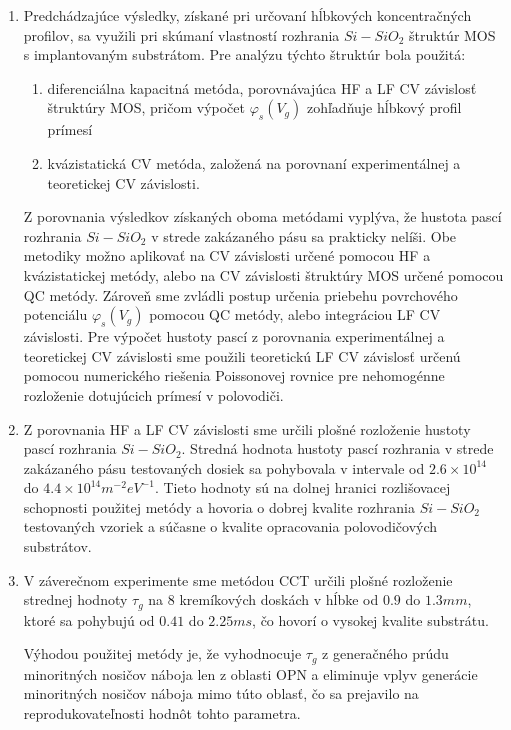 \begin{enumerate}
\item Predchádzajúce výsledky, získané pri určovaní hĺbkových
  koncentračných profilov, sa využili pri skúmaní vlastností rozhrania
  $Si-SiO_{2}$ štruktúr MOS s implantovaným substrátom. Pre analýzu
  týchto štruktúr bola použitá:

  \begin{enumerate}
  \item diferenciálna kapacitná metóda, porovnávajúca HF a LF CV
    závislosť štruktúry MOS, pričom výpočet $\varphi_{s}(V_{g})$
    zohľadňuje hĺbkový profil prímesí
  \item kvázistatická CV metóda, založená na porovnaní experimentálnej
    a teoretickej CV závislosti.
  \end{enumerate}

Z porovnania výsledkov získaných oboma metódami vyplýva, že hustota
pascí rozhrania $Si-SiO_{2}$ v strede zakázaného pásu sa prakticky
nelíši. Obe metodiky možno aplikovať na CV závislosti určené pomocou
HF a kvázistatickej metódy, alebo na CV závislosti štruktúry MOS
určené pomocou QC metódy. Zároveň sme zvládli postup určenia priebehu
povrchového potenciálu $\varphi_s(V_g)$ pomocou QC metódy, alebo
integráciou LF CV závislosti. Pre výpočet hustoty pascí z porovnania
experimentálnej a teoretickej CV závislosti sme použili teoretickú LF
CV závislosť určenú pomocou numerického riešenia Poissonovej rovnice
pre nehomogénne rozloženie dotujúcich prímesí v polovodiči.

\item Z porovnania HF a LF CV závislosti sme určili plošné rozloženie
  hustoty pascí rozhrania $Si-SiO_{2}$. Stredná hodnota hustoty pascí
  rozhrania v strede zakázaného pásu testovaných dosiek sa pohybovala
  v intervale od $2.6 \times 10^{14}$ do $4.4 \times
  10^{14}m^{-2}eV^{-1}$. Tieto hodnoty sú na dolnej hranici
  rozlišovacej schopnosti použitej metódy a hovoria o dobrej kvalite
  rozhrania $Si-SiO_{2}$ testovaných vzoriek a súčasne o kvalite
  opracovania polovodičových substrátov.

\item V záverečnom experimente sme metódou CCT určili plošné
  rozloženie strednej hodnoty $\tau_{g}$ na 8 kremíkových doskách v
  hĺbke od $0.9$ do $1.3 mm$, ktoré sa pohybujú od $0.41$ do $2.25
  ms$, čo hovorí o vysokej kvalite substrátu.

  \newline Výhodou použitej metódy je, že vyhodnocuje $\tau_{g}$ z
  generačného prúdu minoritných nosičov náboja len z oblasti OPN a
  eliminuje vplyv generácie minoritných nosičov náboja mimo túto
  oblasť, čo sa prejavilo na reprodukovateľnosti hodnôt tohto
  parametra.


\end{enumerate}
